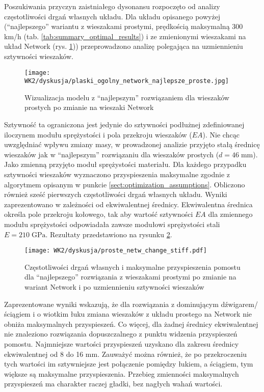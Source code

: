Poszukiwania przyczyn zaistniałego dysonansu rozpoczęto od analizy częstotliwości drgań własnych układu. Dla układu opisanego powyżej (\enquote{najlepszego} wariantu z wieszakami prostymi, prędkością maksymalną 300 km/h (tab. \ref{tab:summary_optimal_results}) i ze zmienionymi wieszakami na układ Network (rys. \ref{fig:proste_na_network_wiz})) przeprowadzono analizę polegająca na uzmiennieniu sztywności wieszaków.

\begin{figure}[hbt!]
	\centering
	\texttt{[image: WK2/dyskusja/plaski\_ogolny\_network\_najlepsze\_proste.jpg]}
	\captionsetup{justification=centering}
	\caption{Wizualizacja modelu z \enquote{najlepszym} rozwiązaniem dla wieszaków prostych po zmianie na wieszaki Network}
	\label{fig:proste_na_network_wiz}
\end{figure}
Sztywność ta ograniczona jest jedynie do sztywności podłużnej zdefiniowanej iloczynem modułu sprężystości i pola przekroju wieszaków ($EA$). Nie chcąc uwzględniać wpływu zmiany masy, w prowadzonej analizie przyjęto stałą średnicę wieszaków jak w \enquote{najlepszym} rozwiązaniu dla wieszaków prostych ($d=46\;\mathrm{mm}$). Jako zmienną przyjęto moduł sprężystości materiału. Dla każdego przypadku sztywności wieszaków wyznaczono przyspieszenia maksymalne zgodnie z algorytmem opisanym w punkcie \ref{sect:optimization_assumptions}. Obliczono również sześć pierwszych częstotliwości drgań własnych układu. Wyniki zaprezentowano w zależności od ekwiwalentnej średnicy. Ekwiwalentna średnica określa pole przekroju kołowego, tak aby wartość sztywności $EA$ dla zmiennego modułu sprężystości odpowiadała zawsze modułowi sprężystości stali $E=210\; \mathrm{GPa}$. Rezultaty przedstawiono na rysunku \ref{fig:proste_na_network_change_hangers_stiff}. 

\begin{figure}[hbt!]
	\centering
	\texttt{[image: WK2/dyskusja/proste\_netw\_change\_stiff.pdf]}
	\captionsetup{justification=centering}
	\caption{Częstotliwości drgań własnych i maksymalne przyspieszenia pomostu dla \enquote{najlepszego} rozwiązania z wieszakami prostymi po zmianie na wariant Network i po uzmiennieniu sztywności wieszaków}
	\label{fig:proste_na_network_change_hangers_stiff}
\end{figure}

Zaprezentowane wyniki wskazują, że dla rozwiązania z dominującym dźwigarem/ściągiem i o wiotkim łuku zmiana wieszaków z układu prostego na Network nie obniża maksymalnych przyspieszeń. Co więcej, dla żadnej średnicy ekwiwalentnej nie znaleziono rozwiązania dopuszczalnego z punktu widzenia przyspieszeń pomostu. Najmniejsze wartości przyspieszeń uzyskano dla zakresu średnicy ekwiwalentnej od 8 do 16 mm. Zauważyć można również, że po przekroczeniu tych wartości im sztywniejsze jest połączenie pomiędzy łukiem, a ściągiem, tym większe są maksymalne przyspieszenia. Przebieg zmienności maksymalnych przyspieszeń ma charakter raczej gładki, bez nagłych wahań wartości.




